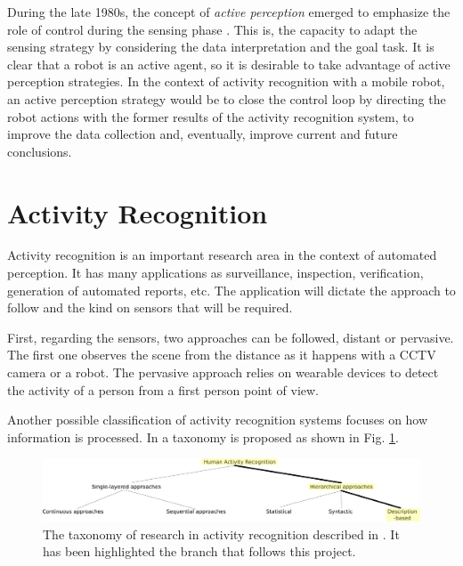 During the late 1980s, the concept of \textit{active perception} emerged to emphasize the role of control during the sensing phase \citep{Bajcsy88_ActivePerception}.
This is, the capacity to adapt the sensing strategy by considering the data interpretation and the goal task.
It is clear that a robot is an active agent, so it is desirable to take advantage of active perception strategies.
In the context of activity recognition with a mobile robot, an active perception strategy would be to close the control loop by directing the robot actions with the former results of the activity recognition system, to improve the data collection and, eventually, improve current and future conclusions.




\section{Activity Recognition} 

Activity recognition is an important research area in the context of automated perception. 
It has many applications as surveillance, inspection, verification, generation of automated reports, etc.
The application will dictate the approach to follow and the kind on sensors that will be required.

First, regarding the sensors, two approaches can be followed, distant or pervasive. 
The first one observes the scene from the distance as it happens with a CCTV camera or a robot. 
The pervasive approach relies on wearable devices to detect the activity of a person from a first person point of view.

Another possible classification of activity recognition systems focuses on how information is processed.
In \citep{Aggarwal11_HumanActivity} a taxonomy is proposed as shown in Fig. \ref{fig:taxonomy}.  

\begin{figure}[h]
\centering
\includegraphics[width=\textwidth]{fig/img_Aggarwal_Taxonomy3.pdf}
\caption{The taxonomy of research in activity recognition described in \cite{Aggarwal11_HumanActivity}. It has been highlighted the branch that follows this project.}
\label{fig:taxonomy}
\end{figure}

